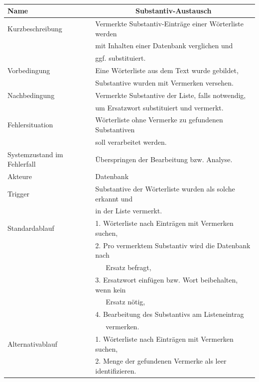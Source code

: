 \documentclass[paper=a4, parskip=half]{scrreprt}
\begin{document}
\newpage
 
\newpage

\begin{table}[htb]
\begin{tabular}{|l|l|}
\hline
Name                        & \multicolumn{1}{c|}{\textbf{Substantiv-Austausch}} \\ \hline
Kurzbeschreibung            & Vermerkte Substantiv-Einträge einer Wörterliste werden \\
                            & mit Inhalten einer Datenbank verglichen und \\
                            & ggf. substituiert. \\ \hline
Vorbedingung                & Eine Wörterliste aus dem Text wurde gebildet, \\
                            & Substantive wurden mit Vermerken versehen. \\ \hline
Nachbedingung               & Vermerkte Substantive der Liste, falls notwendig, \\
                            & um Ersatzwort substituiert und vermerkt. \\ \hline
Fehlersituation             & Wörterliste ohne Vermerke zu gefundenen Substantiven \\
                            & soll verarbeitet werden. \\ \hline
Systemzustand im Fehlerfall & Überspringen der Bearbeitung bzw. Analyse. \\ \hline
Akteure                     & Datenbank \\ \hline
Trigger                     & Substantive der Wörterliste wurden als solche erkannt und \\
                            & in der Liste vermerkt. \\ \hline
Standardablauf              & 1. Wörterliste nach Einträgen mit Vermerken suchen, \\
                            & 2. Pro vermerktem Substantiv wird die Datenbank nach \\ 
                            &    Ersatz befragt, \\
                            & 3. Ersatzwort einfügen bzw. Wort beibehalten, wenn kein \\
                            &    Ersatz nötig, \\
                            & 4. Bearbeitung des Substantivs am Listeneintrag \\
                            &    vermerken.\\ \hline
Alternativablauf            & 1. Wörterliste nach Einträgen mit Vermerken suchen, \\
                            & 2. Menge der gefundenen Vermerke als leer identifizieren. \\ \hline
\end{tabular}
\end{table}
\end{document}
